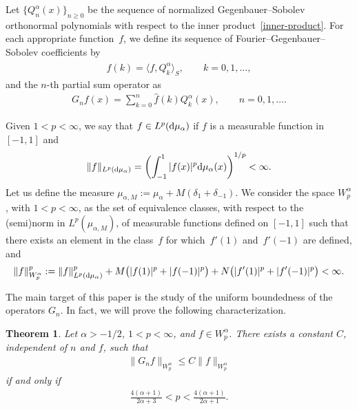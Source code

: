 \documentclass[pdftex]{sigma}
\newtheorem{thm}{Theorem}[section]
\numberwithin{equation}{section}
\begin{document}
Let $\{Q_n^{\alpha}(x)\}_{n\ge 0}$ be the sequence of normalized Gegenbauer--Sobolev orthonormal polynomials with respect to the inner product~\eqref{inner-product}. For each appropriate function~$f$, we define its sequence of Fourier--Gegenbauer--Sobolev coefficients by
\begin{gather*}
\widehat{f}(k)=\langle f, Q_k^{\alpha}\rangle_S, \qquad k=0,1,\dots,
\end{gather*}
and the $n$-th partial sum operator as
\begin{gather*}
G_nf(x)=\sum_{k=0}^n \widehat{f}(k) Q_k^{\alpha}(x), \qquad n=0,1,\dots.
\end{gather*}

Given $1< p<\infty$, we say that $f\in L^p({\rm d}\mu_{\alpha})$ if $f$ is a measurable function in~$[-1,1]$ and
\begin{gather*}
\|f\|_{L^p({\rm d}\mu_{\alpha})}=\left(\int_{-1}^1 |f(x)|^p {\rm d}\mu_{\alpha}(x)\right)^{1/p}<\infty.
\end{gather*}
Let us define the measure $\mu_{\alpha,M} := \mu_\alpha+M(\delta_1+\delta_{-1})$. We consider the space $W_p^{\alpha}$, with $1< p<\infty$, as the set of equivalence classes, with respect to the (semi)norm in $L^p(\mu_{\alpha,M})$, of measurable functions defined on $[-1,1]$ such that there exists an element in the class~$f$ for which~$f'(1)$ and~$f'(-1)$ are defined, and
\begin{gather*}
\|f\|_{W_p^{\alpha}}^p:=\|f\|_{L^p({\rm d}\mu_{\alpha})}^p+M\big(|f(1)|^p+|f(-1)|^p\big) +N\big(|f'(1)|^p+|f'(-1)|^p\big)<\infty.
\end{gather*}

The main target of this paper is the study of the uniform boundedness of the operators $G_n$. In fact, we will prove the following characterization.
\begin{thm}\label{main}
	Let $\alpha>-1/2$, $1<p<\infty$, and $f\in W_p^{\alpha}$. There exists a constant $C$, independent of $n$ and $f$, such that
	\begin{gather*}%
	\|G_nf\|_{W_p^{\alpha}}\le C\|f\|_{W_p^{\alpha}}
	\end{gather*}
	if and only if
	\begin{gather}\label{acotacionp}
	\frac{4(\alpha+1)}{2\alpha+3}<p<\frac{4(\alpha+1)}{2\alpha+1}.
	\end{gather}
\end{thm}
\end{document}
